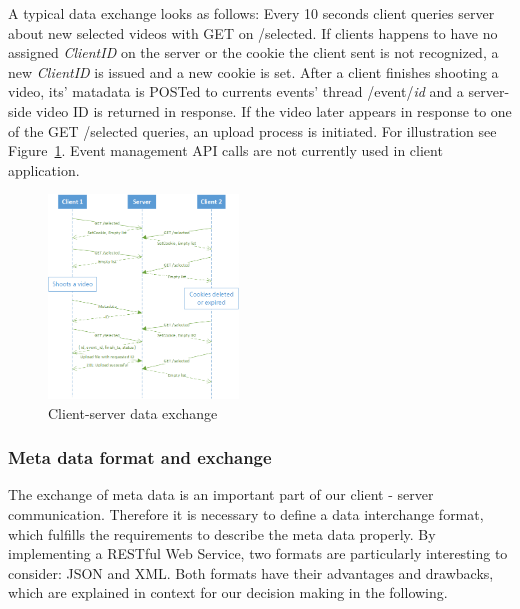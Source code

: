 \documentclass[conference]{IEEEtran}
\begin{document}
A typical data exchange looks as follows:
Every 10 seconds client queries server about new selected videos with GET on /selected.
If clients happens to have no assigned \textsl{ClientID} on the server or the cookie the client 
sent is not recognized, a new \textsl{ClientID} is issued and a new cookie is set.
After a client finishes shooting a video, its' matadata is POSTed to currents events' thread /event/\textit{id}
and a server-side video ID is returned in response.
If the video later appears in response to one of the GET /selected queries, an upload process is initiated.
For illustration see Figure~\ref{fig:protocol}.
Event management API calls are not currently used in client application.

\begin{figure}[!t]
	\centering
	\includegraphics[width=0.45\textwidth]{protocol.png}
	\caption{Client-server data exchange}
	\label{fig:protocol}
\end{figure}

\subsubsection{Meta data format and exchange}
The exchange of meta data is an important part of our client - server communication.
Therefore it is necessary to define a data interchange format, which fulfills the requirements to describe the meta data properly.
By implementing a RESTful Web Service, two formats are particularly interesting to consider: JSON and XML.
Both formats have their advantages and drawbacks, which are explained in context for our decision making in the following.
\end{document}
